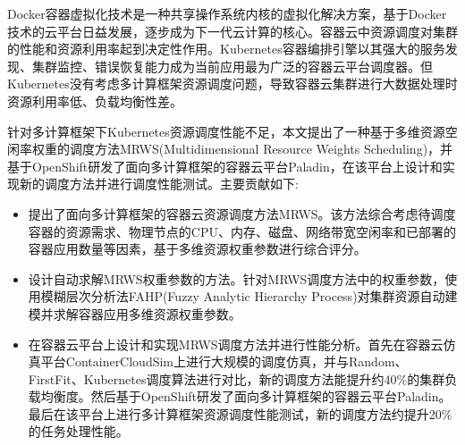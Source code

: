\begin{cabstract}
  Docker容器虚拟化技术是一种共享操作系统内核的虚拟化解决方案，基于Docker技术的云平台日益发展，逐步成为下一代云计算的核心。容器云中资源调度对集群的性能和资源利用率起到决定性作用。Kubernetes容器编排引擎以其强大的服务发现、集群监控、错误恢复能力成为当前应用最为广泛的容器云平台调度器。但Kubernetes没有考虑多计算框架资源调度问题，导致容器云集群进行大数据处理时资源利用率低、负载均衡性差。
  
  针对多计算框架下Kubernetes资源调度性能不足，本文提出了一种基于多维资源空闲率权重的调度方法MRWS(Multidimensional Resource Weights Scheduling)，并基于OpenShift研发了面向多计算框架的容器云平台Paladin，在该平台上设计和实现新的调度方法并进行调度性能测试。主要贡献如下:
  \begin{itemize}
  	\item 提出了面向多计算框架的容器云资源调度方法MRWS。该方法综合考虑待调度容器的资源需求、物理节点的CPU、内存、磁盘、网络带宽空闲率和已部署的容器应用数量等因素，基于多维资源权重参数进行综合评分。
  	\item 设计自动求解MRWS权重参数的方法。针对MRWS调度方法中的权重参数，使用模糊层次分析法FAHP(Fuzzy Analytic Hierarchy Process)对集群资源自动建模并求解容器应用多维资源权重参数。
  	\item 在容器云平台上设计和实现MRWS调度方法并进行性能分析。首先在容器云仿真平台ContainerCloudSim上进行大规模的调度仿真，并与Random、FirstFit、Kubernetes调度算法进行对比，新的调度方法能提升约40\%的集群负载均衡度。然后基于OpenShift研发了面向多计算框架的容器云平台Paladin。最后在该平台上进行多计算框架资源调度性能测试，新的调度方法约提升20\%的任务处理性能。
  \end{itemize}
\end{cabstract}


